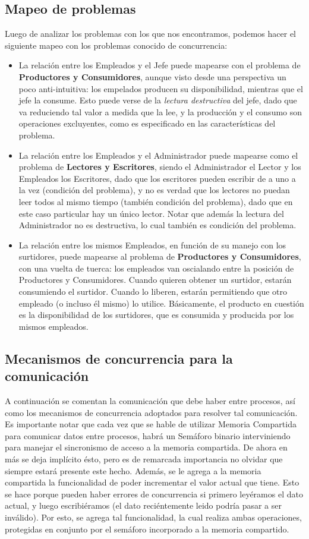 \documentclass[a4paper,12pt]{article}
\begin{document}
\subsection{Mapeo de problemas}
Luego de analizar los problemas con los que nos encontramos, podemos hacer el siguiente mapeo con los problemas conocido de concurrencia:
\begin{itemize}
	\item La relación entre los Empleados y el Jefe puede mapearse con el problema de \textbf{Productores y Consumidores}, aunque visto desde una perspectiva un poco anti-intuitiva: los empelados producen su disponibilidad, mientras que el jefe la consume. Esto puede verse de la \textit{lectura destructiva} del jefe, dado que va reduciendo tal valor a medida que la lee, y la producción y el consumo son operaciones excluyentes, como es especificado en las características del problema.
	\item La relación entre los Empleados y el Administrador puede mapearse como el problema de \textbf{Lectores y Escritores}, siendo el Administrador el Lector y los Empleados los Escritores, dado que los escritores pueden escribir de a uno a la vez (condición del problema), y no es verdad que los lectores no puedan leer todos al mismo tiempo (también condición del problema), dado que en este caso particular hay un único lector. Notar que además la lectura del Administrador no es destructiva, lo cual también es condición del problema.
	\item La relación entre los mismos Empleados, en función de su manejo con los surtidores, puede mapearse al problema de \textbf{Productores y Consumidores}, con una vuelta de tuerca: los empleados van oscialando entre la posición de Productores y Consumidores. Cuando quieren obtener un surtidor, estarán consumiendo el surtidor. Cuando lo liberen, estarán permitiendo que otro empleado (o incluso él mismo) lo utilice. Básicamente, el producto en cuestión es la disponibilidad de los surtidores, que es consumida y producida por los mismos empleados.
\end{itemize}


\subsection{Mecanismos de concurrencia para la comunicación}
A continuación se comentan la comunicación que debe haber entre procesos, así como los mecanismos de concurrencia adoptados para resolver tal comunicación. Es importante notar que cada vez que se hable de utilizar Memoria Compartida para comunicar datos entre procesos, habrá un Semáforo binario interviniendo para manejar el sincronismo de acceso a la memoria compartida. De ahora en más se deja implícito ésto, pero es de remarcada importancia no olvidar que siempre estará presente este hecho. Además, se le agrega a la memoria compartida la funcionalidad de poder incrementar el valor actual que tiene. Esto se hace porque pueden haber errores de concurrencia si primero leyéramos el dato actual, y luego escribiéramos (el dato reciéntemente leido podría pasar a ser inválido). Por esto, se agrega tal funcionalidad, la cual realiza ambas operaciones, protegidas en conjunto por el semáforo incorporado a la memoria compartido. 
\end{document}
